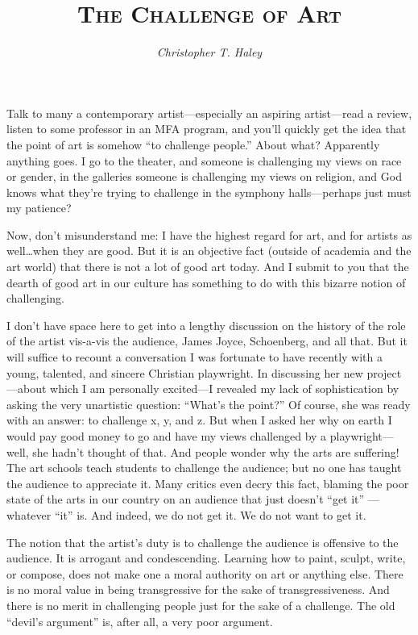 \documentclass[letterpaper]{article}
\title{\textsc{The Challenge of Art}}
\author{\emph{Christopher T. Haley}}
\date{}
\begin{document}
\maketitle

Talk to many a contemporary artist---especially an aspiring
artist---read a review, listen to some professor in an MFA program,
and you'll quickly get the idea that the point of art is somehow ``to
challenge people.'' About what? Apparently anything goes. I go to the
theater, and someone is challenging my views on race or gender, in the
galleries someone is challenging my views on religion, and God knows
what they're trying to challenge in the symphony halls---perhaps just
must my patience?

Now, don't misunderstand me: I have the highest regard for art, and
for artists as well{\ldots}when they are good. But it is an objective
fact (outside of academia and the art world) that there is not a lot
of good art today. And I submit to you that the dearth of good art in
our culture has something to do with this bizarre notion of
challenging.

I don't have space here to get into a lengthy discussion on the
history of the role of the artist vis-a-vis the audience, James Joyce,
Schoenberg, and all that. But it will suffice to recount a
conversation I was fortunate to have recently with a young, talented,
and sincere Christian playwright. In discussing her new
project---about which I am personally excited---I revealed my lack of
sophistication by asking the very unartistic question: ``What's the
point?'' Of course, she was ready with an answer: to challenge x, y,
and z. But when I asked her why on earth I would pay good money to go
and have my views challenged by a playwright---well, she hadn't
thought of that. And people wonder why the arts are suffering! The art
schools teach students to challenge the audience; but no one has
taught the audience to appreciate it. Many critics even decry this
fact, blaming the poor state of the arts in our country on an audience
that just doesn't ``get it'' ---whatever ``it'' is. And indeed, we do
not get it. We do not want to get it.

The notion that the artist's duty is to challenge the audience is
offensive to the audience. It is arrogant and condescending. Learning
how to paint, sculpt, write, or compose, does not make one a moral
authority on art or anything else. There is no moral value in being
transgressive for the sake of transgressiveness. And there is no merit
in challenging people just for the sake of a challenge. The old
``devil's argument'' is, after all, a very poor argument.
\end{document}
